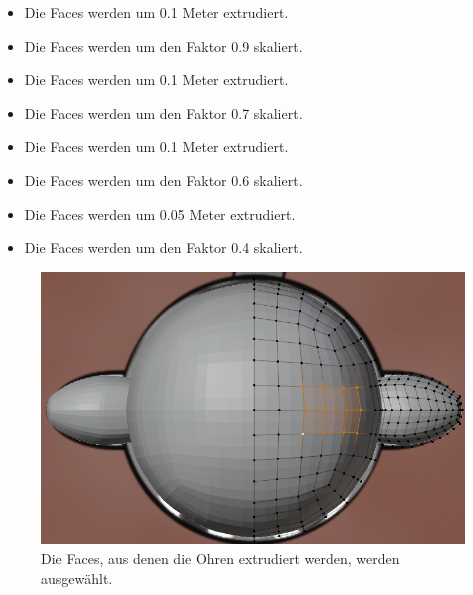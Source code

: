 \documentclass[
]{book}
\providecommand{\tightlist}{%
  \setlength{\itemsep}{0pt}\setlength{\parskip}{0pt}}\usepackage{longtable,booktabs,array}
\begin{document}
\begin{itemize}
\tightlist
\item
  Die Faces werden um 0.1 Meter extrudiert.
\item
  Die Faces werden um den Faktor 0.9 skaliert.
\item
  Die Faces werden um 0.1 Meter extrudiert.
\item
  Die Faces werden um den Faktor 0.7 skaliert.
\item
  Die Faces werden um 0.1 Meter extrudiert.
\item
  Die Faces werden um den Faktor 0.6 skaliert.
\item
  Die Faces werden um 0.05 Meter extrudiert.
\item
  Die Faces werden um den Faktor 0.4 skaliert.
\end{itemize}

\begin{figure}

\includegraphics{Chapters/Images/Chapter_42/42_13_Ears_Faces.png}

\caption{\label{fig-1_13}Die Faces, aus denen die Ohren extrudiert
werden, werden ausgewählt.}

\end{figure}%
\end{document}
